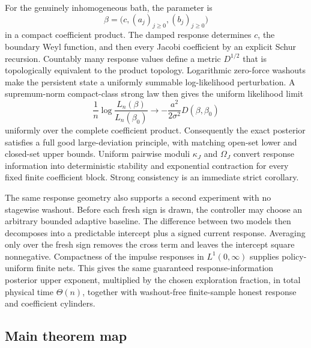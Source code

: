 For the genuinely inhomogeneous bath, the parameter is
\[
 \beta=\bigl(c,(a_j)_{j\ge0},(b_j)_{j\ge0}\bigr)
\]
in a compact coefficient product.  The damped response determines \(c\),
the boundary Weyl function, and then every Jacobi coefficient by an explicit
Schur recursion.  Countably many response values define a metric \(D^{1/2}\)
that is topologically equivalent to the product topology.  Logarithmic
zero-force washouts make the persistent state a uniformly summable
log-likelihood perturbation.  A supremum-norm compact-class strong law then
gives the uniform likelihood limit
\[
 \frac1n\log\frac{L_n(\beta)}{L_n(\beta_0)}
 \longrightarrow-\frac{a^2}{2\sigma^2}D(\beta,\beta_0)
\]
uniformly over the complete coefficient product.  Consequently the exact
posterior satisfies a full good large-deviation principle, with matching
open-set lower and closed-set upper bounds.  Uniform pairwise moduli
\(\kappa_J\) and \(\Omega_J\) convert response information into deterministic
stability and exponential contraction for every fixed finite coefficient
block.  Strong consistency is an immediate strict corollary.

The same response geometry also supports a second experiment with no
stagewise washout.  Before each fresh sign is drawn, the controller may choose
an arbitrary bounded adaptive baseline.  The difference between two models
then decomposes into a predictable intercept plus a signed current response.
Averaging only over the fresh sign removes the cross term and leaves the
intercept square nonnegative.  Compactness of the impulse responses in
\(L^1(0,\infty)\) supplies policy-uniform finite nets.  This gives the same
guaranteed response-information posterior upper exponent, multiplied by the
chosen exploration fraction, in total physical time \(\Theta(n)\), together
with washout-free finite-sample honest response and coefficient cylinders.

\subsection{Main theorem map}

